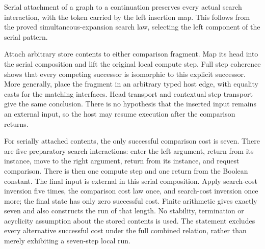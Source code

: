 
Serial attachment of a graph to a continuation preserves every actual
search interaction, with the token carried by the left insertion map.
This follows from the proved simultaneous-expansion search law, selecting
the left component of the serial pattern.


Attach arbitrary store contents to either comparison fragment. Map its
head into the serial composition and lift the original local compute step.
Full step coherence shows that every competing successor is isomorphic to
this explicit successor. More generally, place the fragment in an arbitrary
typed host edge, with equality casts for the matching interfaces. Head
transport and contextual step transport give the same conclusion. There is
no hypothesis that the inserted input remains an external input, so the host
may resume execution after the comparison returns.





For serially attached contents, the only successful comparison cost is
seven. There are five preparatory search interactions: enter the left
argument, return from its instance, move to the right argument, return from
its instance, and request comparison. There is then one compute step and
one return from the Boolean constant. The final input is external in this
serial composition. Apply search-cost inversion five times, the comparison
cost law once, and search-cost inversion once more; the final state has
only zero successful cost. Finite arithmetic gives exactly seven and also
constructs the run of that length. No stability, termination or acyclicity
assumption about the stored contents is used. The statement excludes every
alternative successful cost under the full combined relation, rather than
merely exhibiting a seven-step local run.



